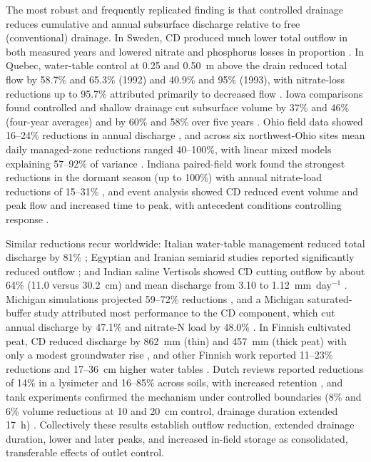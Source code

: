 The most robust and frequently replicated finding is that controlled drainage
reduces cumulative and annual subsurface discharge relative to free
(conventional) drainage. In Sweden, CD produced much lower total outflow in both
measured years and lowered nitrate and phosphorus losses in proportion
\parencite{Wesström2001,Wesström2007}. In Quebec, water-table control at 0.25
and 0.50~m above the drain reduced total flow by 58.7\% and 65.3\% (1992) and
40.9\% and 95\% (1993), with nitrate-loss reductions up to 95.7\% attributed
primarily to decreased flow \parencite{Lalonde1996}. Iowa comparisons found
controlled and shallow drainage cut subsurface volume by 37\% and 46\%
(four-year averages) and by 60\% and 58\% over five years
\parencite{Helmers2012,Schott2017}. Ohio field data showed 16--24\% reductions
in annual discharge \parencite{Pease2017}, and across six northwest-Ohio sites
mean daily managed-zone reductions ranged 40--100\%, with linear mixed models
explaining 57--92\% of variance \parencite{Gunn2015}. Indiana paired-field work
found the strongest reductions in the dormant season (up to 100\%) with annual
nitrate-load reductions of 15--31\% \parencite{Adeuya2012}, and event analysis
showed CD reduced event volume and peak flow and increased time to peak, with
antecedent conditions controlling response \parencite{Lahdou2019}.

Similar reductions recur worldwide: Italian water-table management reduced total
discharge by 81\% \parencite{Tolomio2018}; Egyptian and Iranian semiarid studies
reported significantly reduced outflow \parencite{Wahba2001,Jouni2018}; and
Indian saline Vertisols showed CD cutting outflow by about 64\% (11.0 versus
30.2~cm) and mean discharge from 3.10 to 1.12~mm~day$^{-1}$
\parencite{Karegoudar2019}. Michigan simulations projected 59--72\% reductions
\parencite{BinShokrana2023}, and a Michigan saturated-buffer study attributed
most performance to the CD component, which cut annual discharge by 47.1\% and
nitrate-N load by 48.0\% \parencite{Ghane2025}. In Finnish cultivated peat, CD
reduced discharge by 862~mm (thin) and 457~mm (thick peat) with only a modest
groundwater rise \parencite{Tähtikarhu2025}, and other Finnish work reported
11--23\% reductions and 17--36~cm higher water tables \parencite{Salla2022}.
Dutch reviews reported reductions of 14\% in a lysimeter and 16--85\% across
soils, with increased retention \parencite{deWit2022}, and tank experiments
confirmed the mechanism under controlled boundaries (8\% and 6\% volume
reductions at 10 and 20~cm control, drainage duration extended 17~h)
\parencite{Zheng2025}. Collectively these results establish outflow reduction,
extended drainage duration, lower and later peaks, and increased in-field
storage as consolidated, transferable effects of outlet control.

